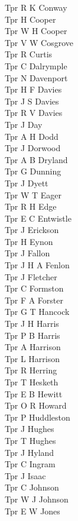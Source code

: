 \begin{multicols}{3}
  Tpr R K Conway \\
  Tpr H Cooper \\
  Tpr W H Cooper \\
  Tpr V W Cosgrove \\
  Tpr R Curtis \\
  Tpr C Dalrymple \\
  Tpr N Davenport \\
  Tpr H F Davies \\
  Tpr J S Davies \\
  Tpr R V Davies \\
  Tpr J Day \\
  Tpr A H Dodd \\
  Tpr J Dorwood \\
  Tpr A B Dryland \\
  Tpr G Dunning \\
  Tpr J Dyett \\
  Tpr W T Eager \\
  Tpr R H Edge \\
  Tpr E C Entwistle \\
  Tpr J Erickson \\
  Tpr H Eynon \\
  Tpr J Fallon \\
  Tpr J H A Fenlon \\
  Tpr J Fletcher \\
  Tpr C Formston \\
  Tpr F A Forster \\
  Tpr G T Hancock \\
  Tpr J H Harris \\
  Tpr P B Harris \\
  Tpr A Harrison \\
  Tpr L Harrison \\
  Tpr R Herring \\
  Tpr T Hesketh \\
  Tpr E B Hewitt \\
  Tpr O R Howard \\
  Tpr P Huddleston \\
  Tpr J Hughes \\
  Tpr T Hughes \\
  Tpr J Hyland \\
  Tpr C Ingram \\
  Tpr J Isaac \\
  Tpr C Johnson \\
  Tpr W J Johnson \\
  Tpr E W Jones \\

\end{multicols}
